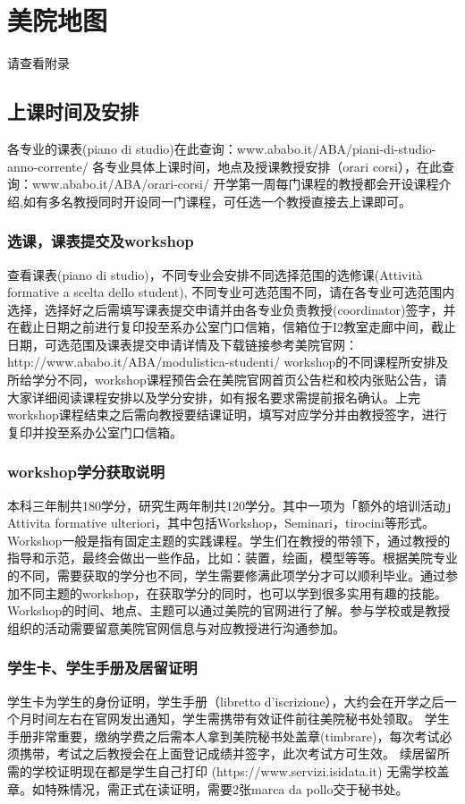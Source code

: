 \section{美院地图}
请查看附录
\subsection{上课时间及安排}
各专业的课表(piano di studio)在此查询：www.ababo.it/ABA/piani-di-studio-anno-corrente/ 
各专业具体上课时间，地点及授课教授安排（orari corsi），在此查询：www.ababo.it/ABA/orari-corsi/
开学第一周每门课程的教授都会开设课程介绍,如有多名教授同时开设同一门课程，可任选一个教授直接去上课即可。
\subsubsection{选课，课表提交及workshop}
查看课表(piano di studio)，不同专业会安排不同选择范围的选修课(Attività formative a scelta dello student), 不同专业可选范围不同，请在各专业可选范围内选择，选择好之后需填写课表提交申请并由各专业负责教授(coordinator)签字，并在截止日期之前进行复印投至系办公室门口信箱，信箱位于I2教室走廊中间，截止日期，可选范围及课表提交申请详情及下载链接参考美院官网：http://www.ababo.it/ABA/modulistica-studenti/
workshop的不同课程所安排及所给学分不同，workshop课程预告会在美院官网首页公告栏和校内张贴公告，请大家详细阅读课程安排以及学分安排，如有报名要求需提前报名确认。上完workshop课程结束之后需向教授要结课证明，填写对应学分并由教授签字，进行复印并投至系办公室门口信箱。
\subsubsection{workshop学分获取说明}
本科三年制共180学分，研究生两年制共120学分。其中一项为「额外的培训活动」Attivita formative ulteriori，其中包括Workshop，Seminari，tirocini等形式。
Workshop一般是指有固定主题的实践课程。学生们在教授的带领下，通过教授的指导和示范，最终会做出一些作品，比如：装置，绘画，模型等等。根据美院专业的不同，需要获取的学分也不同，学生需要修满此项学分才可以顺利毕业。通过参加不同主题的workshop，在获取学分的同时，也可以学到很多实用有趣的技能。
Workshop的时间、地点、主题可以通过美院的官网进行了解。参与学校或是教授组织的活动需要留意美院官网信息与对应教授进行沟通参加。
\subsubsection{学生卡、学生手册及居留证明}
学生卡为学生的身份证明，学生手册（libretto d’iscrizione），大约会在开学之后一个月时间左右在官网发出通知，学生需携带有效证件前往美院秘书处领取。
学生手册非常重要，缴纳学费之后需本人拿到美院秘书处盖章(timbrare)，每次考试必须携带，考试之后教授会在上面登记成绩并签字，此次考试方可生效。
续居留所需的学校证明现在都是学生自己打印 (https://www.servizi.isidata.it) 无需学校盖章。如特殊情况，需正式在读证明，需要2张marca da pollo交于秘书处。
